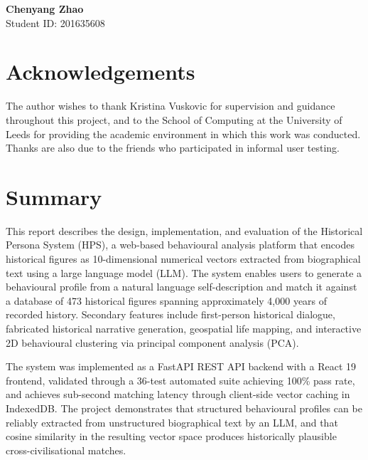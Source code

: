 \documentclass[11pt, a4paper]{report}
\begin{document}
\vspace{1cm}
\noindent\textbf{Chenyang Zhao} \\
Student ID: 201635608

\clearpage

\chapter*{Acknowledgements}

The author wishes to thank Kristina Vuskovic for supervision and guidance throughout this project, and to the School of Computing at the University of Leeds for providing the academic environment in which this work was conducted. Thanks are also due to the friends who participated in informal user testing.

\clearpage

\chapter*{Summary}

This report describes the design, implementation, and evaluation of the Historical Persona System (HPS), a web-based behavioural analysis platform that encodes historical figures as 10-dimensional numerical vectors extracted from biographical text using a large language model (LLM). The system enables users to generate a behavioural profile from a natural language self-description and match it against a database of 473 historical figures spanning approximately 4,000 years of recorded history. Secondary features include first-person historical dialogue, fabricated historical narrative generation, geospatial life mapping, and interactive 2D behavioural clustering via principal component analysis (PCA).

The system was implemented as a FastAPI REST API backend with a React 19 frontend, validated through a 36-test automated suite achieving 100\% pass rate, and achieves sub-second matching latency through client-side vector caching in IndexedDB. The project demonstrates that structured behavioural profiles can be reliably extracted from unstructured biographical text by an LLM, and that cosine similarity in the resulting vector space produces historically plausible cross-civilisational matches.
\end{document}
